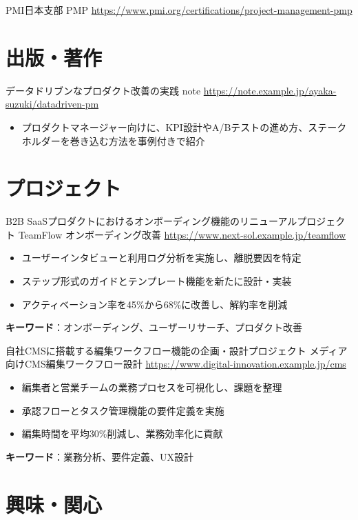 \documentclass[a4paper, serif, 10pt]{moderncv}
\begin{document}
        {PMI日本支部}
        {PMP}
        {\url{https://www.pmi.org/certifications/project-management-pmp}}
        {}
        {}
\section{出版・著作}

        {データドリブンなプロダクト改善の実践}
        {note}
        {\url{https://note.example.jp/ayaka-suzuki/datadriven-pm}}
        {}
        {\begin{itemize}
\item プロダクトマネージャー向けに、KPI設計やA/Bテストの進め方、ステークホルダーを巻き込む方法を事例付きで紹介
\end{itemize}}
\section{プロジェクト}

        {B2B SaaSプロダクトにおけるオンボーディング機能のリニューアルプロジェクト}
        {TeamFlow オンボーディング改善}
        {\url{https://www.next-sol.example.jp/teamflow}}
        {}
        {\begin{itemize}
\item ユーザーインタビューと利用ログ分析を実施し、離脱要因を特定
\item ステップ形式のガイドとテンプレート機能を新たに設計・実装
\item アクティベーション率を45\%から68\%に改善し、解約率を削減
\end{itemize}
\textbf{キーワード}：オンボーディング、ユーザーリサーチ、プロダクト改善}

        {自社CMSに搭載する編集ワークフロー機能の企画・設計プロジェクト}
        {メディア向けCMS編集ワークフロー設計}
        {\url{https://www.digital-innovation.example.jp/cms}}
        {}
        {\begin{itemize}
\item 編集者と営業チームの業務プロセスを可視化し、課題を整理
\item 承認フローとタスク管理機能の要件定義を実施
\item 編集時間を平均30\%削減し、業務効率化に貢献
\end{itemize}
\textbf{キーワード}：業務分析、要件定義、UX設計}
\section{興味・関心}
\end{document}
